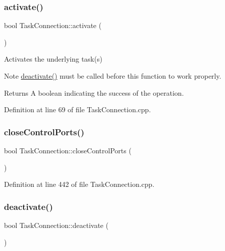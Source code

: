 \subsubsection{\texorpdfstring{activate()}{activate()}}
{\footnotesize\ttfamily bool Task\+Connection\+::activate (\begin{DoxyParamCaption}{ }\end{DoxyParamCaption})}

Activates the underlying task(s) \begin{DoxyNote}{Note}
{\ttfamily \hyperlink{classocra__recipes_1_1TaskConnection_a8488250380b7fd9598f3246ec6111d6a}{deactivate()}} must be called before this function to work properly.
\end{DoxyNote}
\begin{DoxyReturn}{Returns}
A boolean indicating the success of the operation. 
\end{DoxyReturn}


Definition at line 69 of file Task\+Connection.\+cpp.

\hypertarget{classocra__recipes_1_1TaskConnection_abc322bd749033fad00193ca63701a1f5}{}\label{classocra__recipes_1_1TaskConnection_abc322bd749033fad00193ca63701a1f5} 
\subsubsection{\texorpdfstring{close\+Control\+Ports()}{closeControlPorts()}}
{\footnotesize\ttfamily bool Task\+Connection\+::close\+Control\+Ports (\begin{DoxyParamCaption}{ }\end{DoxyParamCaption})}



Definition at line 442 of file Task\+Connection.\+cpp.

\hypertarget{classocra__recipes_1_1TaskConnection_a8488250380b7fd9598f3246ec6111d6a}{}\label{classocra__recipes_1_1TaskConnection_a8488250380b7fd9598f3246ec6111d6a} 
\subsubsection{\texorpdfstring{deactivate()}{deactivate()}}
{\footnotesize\ttfamily bool Task\+Connection\+::deactivate (\begin{DoxyParamCaption}{ }\end{DoxyParamCaption})}

